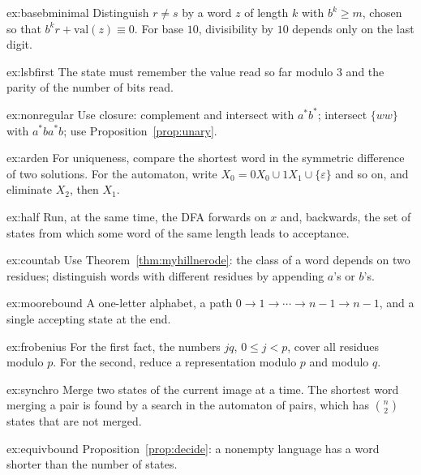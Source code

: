 \begin{hint}{ex:basebminimal}
Distinguish $r\ne s$ by a word $z$ of length $k$ with $b^k\ge m$, chosen so that $b^kr+\mathrm{val}(z)\equiv0$. For base $10$, divisibility by $10$ depends only on the last digit.
\end{hint}
\begin{hint}{ex:lsbfirst}
The state must remember the value read so far modulo $3$ and the parity of the number of bits read.
\end{hint}
\begin{hint}{ex:nonregular}
Use closure: complement and intersect with $a^*b^*$; intersect $\{ww\}$ with $a^*ba^*b$; use Proposition~\ref{prop:unary}.
\end{hint}
\begin{hint}{ex:arden}
For uniqueness, compare the shortest word in the symmetric difference of two solutions. For the automaton, write $X_0=0X_0\cup1X_1\cup\{\varepsilon\}$ and so on, and eliminate $X_2$, then $X_1$.
\end{hint}
\begin{hint}{ex:half}
Run, at the same time, the DFA forwards on $x$ and, backwards, the set of states from which some word of the same length leads to acceptance.
\end{hint}
\begin{hint}{ex:countab}
Use Theorem~\ref{thm:myhillnerode}: the class of a word depends on two residues; distinguish words with different residues by appending $a$'s or $b$'s.
\end{hint}
\begin{hint}{ex:moorebound}
A one-letter alphabet, a path $0\to1\to\cdots\to n-1\to n-1$, and a single accepting state at the end.
\end{hint}
\begin{hint}{ex:frobenius}
For the first fact, the numbers $jq$, $0\le j<p$, cover all residues modulo $p$. For the second, reduce a representation modulo $p$ and modulo $q$.
\end{hint}
\begin{hint}{ex:synchro}
Merge two states of the current image at a time. The shortest word merging a pair is found by a search in the automaton of pairs, which has $\binom n2$ states that are not merged.
\end{hint}
\begin{hint}{ex:equivbound}
Proposition~\ref{prop:decide}: a nonempty language has a word shorter than the number of states.
\end{hint}

